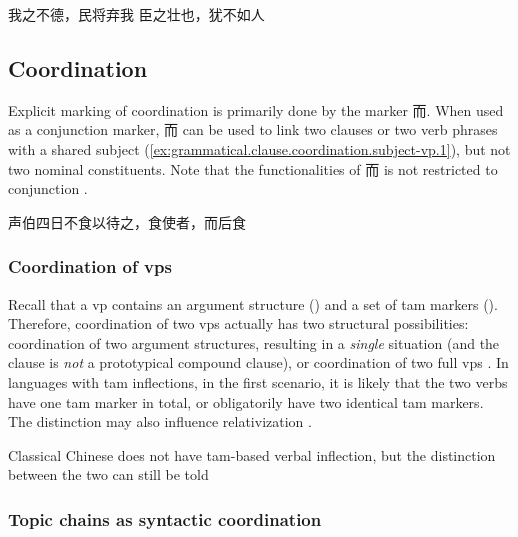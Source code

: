 \documentclass[UTF8, a4paper, oneside, scheme=plain, 12pt]{ctexrep}
\newcommand*{\citepage}[1]{p.~{#1}}
\newcommand*{\citepages}[1]{pp.~{#1}}
\begin{document}
\begin{exe}
    \ex\label{ex:grammatical.clause.linking.gerundive.condition.1} 我之不德，民将弃我
    \ex\label{ex:grammatical.clause.linking.gerundive.temporal.1} 臣之壮也，犹不如人
\end{exe}

\subsection{Coordination}\label{sec:grammatical.clause.coordination}

Explicit marking of coordination is primarily done by the marker 而.
When used as a conjunction marker, 而 can be used to link two clauses 
or two verb phrases with a shared subject (\ref{ex:grammatical.clause.coordination.subject-vp.1}),
but not two nominal constituents.
Note that the functionalities of 而 is not restricted to conjunction \citep[\citepage{183}]{meiguang2018}.

\begin{exe}
    \ex\label{ex:grammatical.clause.coordination.subject-vp.1} 
    声伯四日不食以待之，食使者，而后食
\end{exe}

\subsubsection{Coordination of \acp{vp}}\label{sec:grammatical.clause.coordination.vp}

Recall that a \ac{vp} contains an argument structure () and a set of \ac{tam} markers ().
Therefore, coordination of two \acp{vp} actually has two structural possibilities:
coordination of two argument structures, resulting in a \emph{single} situation
(and the clause is \emph{not} a prototypical compound clause),
or coordination of two full \acp{vp}
\citep[\citepages{192-201}]{meiguang2018}.
In languages with \ac{tam} inflections, in the first scenario,
it is likely that the two verbs have one \ac{tam} marker in total,
or obligatorily have two identical \ac{tam} markers.
The distinction may also influence relativization \citep[\citepage{207}]{meiguang2018}.

Classical Chinese does not have \ac{tam}-based verbal inflection,
but the distinction between the two can still be told 

\subsubsection{Topic chains as syntactic coordination}\label{sec:grammatical.clause.coordination.topic-chain}
\end{document}
